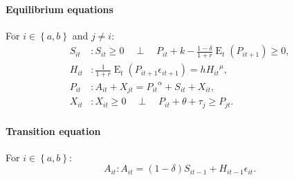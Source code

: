 \documentclass[11pt,fleqn]{article}
\DeclareMathOperator{\E}{E}
\newcommand{\CP}{\quad \perp \quad}
\begin{document}
\paragraph{Equilibrium equations}
\label{sec:equil-equat}

For $i \in \left\{a,b\right\}$ and $j \ne i$:
\begin{align}
  S_{it}&: S_{it}\ge 0 \CP P_{it}+k-\frac{1-\delta}{1+r}\E_{t}\left(P_{it+1}\right)\ge 0,\\
  H_{it}&: \frac{1}{1+r}\E_{t}\left(P_{it+1}\epsilon_{it+1}\right)=h {H_{it}}^{\mu},\\
  P_{it}&: A_{it}+X_{jt}={P_{it}}^{\alpha}+S_{it}+X_{it},\\
  X_{it}&: X_{it}\ge 0 \CP P_{it}+\theta+\tau_{j}\ge P_{jt}.
\end{align}

\paragraph{Transition equation}
\label{sec:transition-equation}

For $i \in \left\{a,b\right\}$:
\begin{equation}
  A_{it}: A_{it}=\left(1-\delta\right)S_{it-1}+H_{it-1}\epsilon_{it}.
\end{equation}

%
\end{document}
